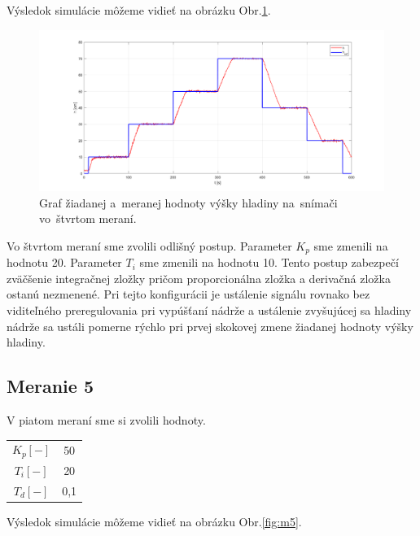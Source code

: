 \documentclass{article}
\begin{document}
Výsledok simulácie môžeme vidieť na obrázku Obr.\ref{fig:m4}.

\begin{figure}[!htbp]
	\begin{center}
		\includegraphics[width=\textwidth]{./include/meranie4.png}
	\end{center}
	\caption{Graf žiadanej a~meranej hodnoty výšky hladiny na~snímači vo~štvrtom meraní.}
	\label{fig:m4}
\end{figure}

Vo štvrtom meraní sme zvolili odlišný postup. Parameter $K_p$ sme zmenili na hodnotu 20. Parameter $T_i$
sme zmenili na hodnotu 10. Tento postup zabezpečí zväčšenie integračnej zložky pričom proporcionálna
zložka a derivačná zložka ostanú nezmenené. Pri tejto konfigurácii je ustálenie signálu rovnako
bez viditeľného preregulovania pri vypúšťaní nádrže a ustálenie zvyšujúcej sa hladiny nádrže sa ustáli
pomerne rýchlo pri prvej skokovej zmene žiadanej hodnoty výšky hladiny.

\clearpage

\subsection{Meranie 5}
\label{sec:meranie5}

V piatom meraní sme si zvolili hodnoty. 

\begin{center}
\begin{tabular}{ |c|c| }
 \hline
 $K_p [-]$ & 50 \\
 $T_i [-]$ & 20 \\
 $T_d [-]$ & 0,1 \\
 \hline
\end{tabular}
\end{center}

Výsledok simulácie môžeme vidieť na obrázku Obr.\ref{fig:m5}.
\end{document}
